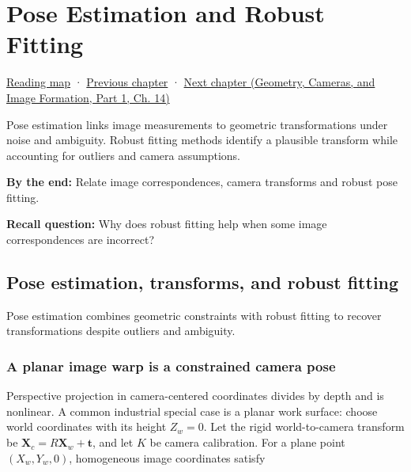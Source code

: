 \chapter{Pose Estimation and Robust Fitting}\label{04-visual-computing-ii-ch032-pose-estimation-and-robust-fitting}\hypertarget{04-visual-computing-ii-ch032}{}\label{stagechapter:04-visual-computing-ii-ch032}

\hypertarget{04-visual-computing-ii-ch032-pose-estimation-and-robust-fitting}{}

\hyperref[volume-reading-map]{Reading map} · \hyperref[04-visual-computing-ii-ch031-learning-a-visual-classifier]{Previous chapter} · \href{../03-Geometry-Cameras-and-Image-Formation-P01/main.pdf\#nameddest=04-visual-computing-ii-ch033-projection-scale-and-incidence-geometry}{Next chapter (Geometry, Cameras, and Image Formation, Part 1, Ch. 14)}

Pose estimation links image measurements to geometric transformations under noise and ambiguity. Robust fitting methods identify a plausible transform while accounting for outliers and camera assumptions.

\textbf{By the end:} Relate image correspondences, camera transforms and robust pose fitting.

\textbf{Recall question:} Why does robust fitting help when some image correspondences are incorrect?

\section{Pose estimation, transforms, and robust fitting}\label{04-visual-computing-ii-ch032-pose-estimation-transforms-and-robust-fitting}

\hypertarget{04-visual-computing-ii-ch032-pose-estimation-transforms-and-robust-fitting}{}

Pose estimation combines geometric constraints with robust fitting to recover transformations despite outliers and ambiguity.

\subsection{A planar image warp is a constrained camera pose}\label{04-visual-computing-ii-ch032-a-planar-image-warp-is-a-constrained-camera-pose}

\hypertarget{04-visual-computing-ii-ch032-a-planar-image-warp-is-a-constrained-camera-pose}{}

Perspective projection in camera-centered coordinates divides by depth and is nonlinear. A common industrial special case is a planar work surface: choose world coordinates with its height \(Z_w=0\). Let the rigid world-to-camera transform be \(\mathbf{X}_c=R\mathbf{X}_w+\mathbf{t}\), and let \(K\) be camera calibration. For a plane point \((X_w,Y_w,0)\), homogeneous image coordinates satisfy

